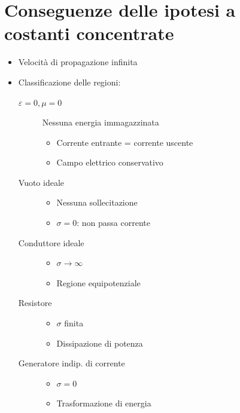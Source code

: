 \section*{Conseguenze delle ipotesi a costanti concentrate}
\begin{itemize}
    \item Velocit\`a di propagazione infinita
    \item Classificazione delle regioni:
    \begin{description}
        \item[\( \varepsilon = 0, \mu = 0 \)] Nessuna energia immagazzinata
        \begin{itemize}
            \item Corrente entrante = corrente uscente
            \item Campo elettrico conservativo
        \end{itemize}
        
        \item[Vuoto ideale]
        \begin{itemize}
            \item Nessuna sollecitazione
            \item \( \sigma = 0 \): non passa corrente
        \end{itemize}

        \vspace{1cm}

        \item[Conduttore ideale]
        \begin{itemize}
            \item \( \sigma \rightarrow \infty \)
            \item Regione equipotenziale
        \end{itemize}

        \item[Resistore]
        \begin{itemize}
            \item \( \sigma \) finita
            \item Dissipazione di potenza
        \end{itemize}

        \item[Generatore indip. di corrente]
        \begin{itemize}
            \item \( \sigma = 0 \)
            \item Trasformazione di energia
        \end{itemize}


\end{description}
\end{itemize}
